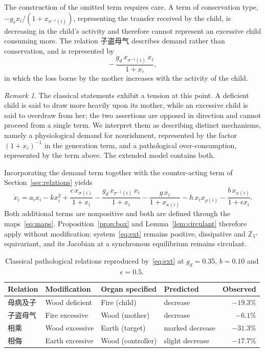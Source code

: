 \documentclass[11pt]{article}
\newcommand{\Z}{{\mathbb{Z}}}
\theoremstyle{definition}
\theoremstyle{remark}
\newtheorem{remark}[theorem]{Remark}
\begin{document}
	The construction of the omitted term requires care. A term of conservation type,
	$-g_s x_i/(1+x_{\sigma^{-1}(i)})$, representing the transfer received by the child,
	is decreasing in the child's activity and therefore cannot represent an excessive
	child consuming more. The relation 子盗母气 describes demand rather than
	conservation, and is represented by
	\[
	-\,\frac{g_d\,x_{\sigma^{-1}(i)}\,x_i}{1+x_i},
	\]
	in which the loss borne by the mother increases with the activity of the child.
	
	\begin{remark}
		The classical statements exhibit a tension at this point. A deficient child is said
		to draw more heavily upon its mother, while an excessive child is said to overdraw
		from her; the two assertions are opposed in direction and cannot proceed from a
		single term. We interpret them as describing distinct mechanisms, namely a
		physiological demand for nourishment, represented by the factor $(1+x_i)^{-1}$ in
		the generation term, and a pathological over-consumption, represented by the term
		above. The extended model contains both.
	\end{remark}
	
	Incorporating the demand term together with the counter-acting term of
	Section~\ref{sec:relations} yields
	\begin{equation}\label{eq:ext}
		\dot{x}_i =
		a_i x_i - k x_i^2
		+\frac{c\,x_{\sigma(i)}}{1+x_i}
		-\frac{g_d\,x_{\sigma^{-1}(i)}\,x_i}{1+x_i}
		-\frac{g\,x_i}{1+x_{\kappa(i)}}
		-h\,x_i x_{\rho(i)}
		-\frac{b\,x_{\kappa(i)}}{1+\epsilon x_i} .
	\end{equation}
	Both additional terms are nonpositive and both are defined through the
	maps~\eqref{eq:maps}. Proposition~\ref{prop:box} and Lemma~\ref{lem:circulant}
	therefore apply without modification: system~\eqref{eq:ext} remains positive,
	dissipative and $\Z_5$-equivariant, and its Jacobian at a synchronous equilibrium
	remains circulant.
	
	\begin{table}[!htb]
		\centering
		\begin{tabular}{llll r}
			\toprule
			Relation & Modification & Organ specified & Predicted & Observed \\
			\midrule
			母病及子 & Wood deficient  & Fire (child)      & decrease          & $-19.3\%$ \\
			子盗母气 & Fire excessive  & Wood (mother)     & decrease          & $-6.1\%$  \\
			相乘     & Wood excessive  & Earth (target)    & marked decrease   & $-31.3\%$ \\
			相侮     & Earth excessive & Wood (controller) & slight decrease   & $-17.7\%$ \\
			\bottomrule
		\end{tabular}
		\caption{Classical pathological relations reproduced by~\eqref{eq:ext} at
			$g_d=0.35$, $b=0.10$ and $\epsilon=0.5$.}
		\label{tab:pathologies}
	\end{table}
	
\end{document}
